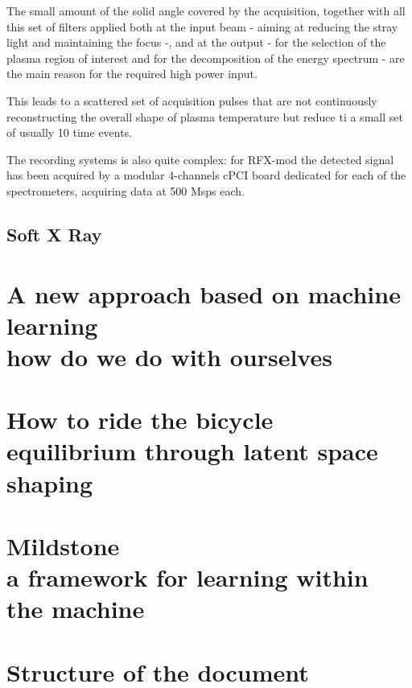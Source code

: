 The small amount of the solid angle covered by the acquisition, together with all this set of filters applied both at the input beam - aiming at reducing the stray light and maintaining the focus -, and at the output - for the selection of the plasma region of interest and for the decomposition of the energy spectrum - are the main reason for the required high power input.

This leads to a scattered set of acquisition pulses that are not continuously reconstructing the overall shape of plasma temperature but reduce ti a small set of usually 10 time events.

The recording systems is also quite complex: for RFX-mod the detected signal has been acquired by a modular 4-channels cPCI board dedicated for each of the spectrometers, acquiring data at 500 Msps each.

\subsection{Soft X Ray}


\section{A new approach based on machine learning \\ \small{ how do we do with ourselves }}
\cite{Goodfellow-et-al-2016}




\section{How to ride the bicycle \\ \small{ equilibrium through latent space shaping }}
\cite{rideabike_nature_2016}


\section{Mildstone \\ \small{ a framework for learning within the machine }}

\section{Structure of the document}